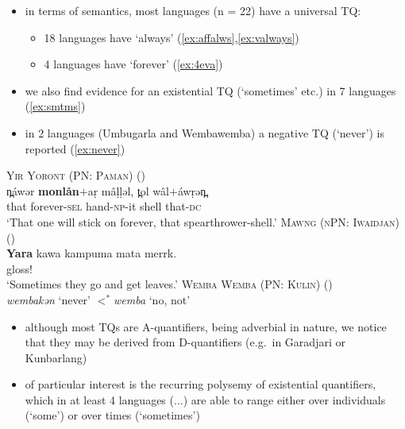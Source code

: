 \documentclass{article}
\begin{document}
\begin{itemize}
\item in terms of semantics, most languages (n = 22) have a universal TQ:
  \begin{itemize}
  \item 18 languages have `always' (\ref{ex:affalws},\ref{ex:valways})
  \item 4 languages have `forever' (\ref{ex:4eva})
  \end{itemize}
\item we also find evidence for an existential TQ (`sometimes' etc.) in 7 languages (\ref{ex:smtms}) %
\item in 2 languages (Umbugarla and Wembawemba) a negative TQ (`never') is reported (\ref{ex:never})
\end{itemize}

\begin{exe}
  \ex\label{ex:4eva} \textsc{Yir Yoront (PN: Paman)} (\citealt[343]{alpher73})\\
  \gll n̪\'awər \textbf{monlån}$+$a\d{r} m\^a\d{l}\d{l}əl, t̪ol w\^al$+$\'aw\d{r}ən̪.\\
  that forever-\textsc{sel} hand-\textsc{np}-it shell that-\textsc{dc}\\
  \glt `That one will stick on forever, that spearthrower-shell.'
  \ex\label{ex:smtms} \textsc{Mawng (nPN: Iwaidjan)} (\citealt{ngaralk})\\
  \gll \textbf{Yara} kawa kampuma mata merrk.\\
  gloss!\\
  \glt `Sometimes they go and get leaves.'
  \ex\label{ex:never} \textsc{Wemba Wemba (PN: Kulin)} (\citealt[47]{hercus92})\\
  \textit{wembakən} `never' $<^*$\textit{wemba} `no, not'
\end{exe}

\begin{itemize}
\item although most TQs are A-quantifiers, being adverbial in nature, we notice that they may be derived from D-quantifiers (e.g.\ in Garadjari or Kunbarlang)
\item of particular interest is the recurring polysemy of existential quantifiers, which in at least 4 languages (...) are able to range either over individuals (`some') or over times (`sometimes')
\end{itemize}
\end{document}
